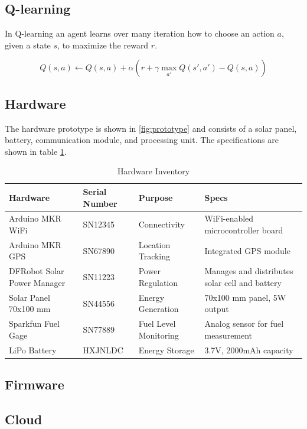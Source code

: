 \documentclass[10pt]{cai}
\begin{document}
\subsection{Q-learning}

In Q-learning an agent learns over many iteration how to choose an action $a$, given a state $s$, to maximize the reward $r$.

\begin{equation}
  Q(s,a) \leftarrow Q(s,a) + \alpha \left( r + \gamma \max_{a'} Q(s',a') - Q(s,a) \right)
\end{equation}

\subsection{Hardware}
The hardware prototype is shown in \ref{fig:prototype} and consists of a solar panel, battery, communication module, and processing unit.
The specifications are shown in table \ref{tab:hardware_inventory}.

\begin{table}[h!]
  \centering
  \caption{Hardware Inventory}
  \begin{tabular}{|l|l|l|l|}
  \hline
  \textbf{Hardware} & \textbf{Serial Number} & \textbf{Purpose} & \textbf{Specs} \\ \hline
  Arduino MKR WiFi & SN12345 & Connectivity & WiFi-enabled microcontroller board \\ \hline
  Arduino MKR GPS  & SN67890 & Location Tracking & Integrated GPS module \\ \hline
  DFRobot Solar Power Manager & SN11223 & Power Regulation & Manages and distributes solar cell and battery \\ \hline
  Solar Panel 70x100 mm & SN44556 & Energy Generation & 70x100 mm panel, 5W output \\ \hline
  Sparkfun Fuel Gage & SN77889 & Fuel Level Monitoring & Analog sensor for fuel measurement \\ \hline
  LiPo Battery & HXJNLDC & Energy Storage & 3.7V, 2000mAh capacity \\ \hline
  \end{tabular}
  \label{tab:hardware_inventory}
  \end{table}


\subsection{Firmware}

\subsection{Cloud}
\end{document}
